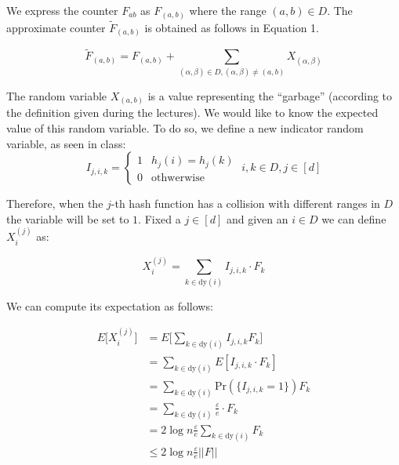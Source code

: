 \documentclass{article}
\begin{document}
\noindent We express the counter $F_{ab}$ as $F_{(a, b)}$ where the range $(a, b) \in D$. The approximate counter $\tilde{F}_{(a, b)}$ is obtained
as follows in Equation 1.

\begin{equation}
    \tilde{F}_{(a, b)} = F_{(a, b)} + \sum_{(\alpha, \beta) \in D,(\alpha, \beta) \ne (a, b)} X_{(\alpha, \beta)}
\end{equation}

\noindent The random variable $X_{(a, b)}$ is a value representing the ``garbage'' (according to the definition given during the lectures). We would like to know the expected value of this random variable.
To do so, we define a new indicator random variable, as seen in class:
\begin{equation*}
    I_{j,i,k} = \begin{cases}
        1 & h_j(i) = h_j(k) \\
        0 & \textrm{othwerwise}
    \end{cases} \; i, k \in D, j \in [d]
\end{equation*}

\noindent Therefore, when the $j$-th hash function has a collision with different ranges in $D$ the variable will be set to $1$. 
Fixed a $j \in [d]$ and given an $i \in D$ we can define $X_{i}^{(j)}$ as: 

\begin{equation*}
    X_{i}^{(j)} = \sum_{k \in \textrm{dy}(i)}I_{j, i, k} \cdot  F_k
\end{equation*}

\noindent We can compute its expectation as follows:

\begin{equation*}
    \begin{split}
        E\bigg[X_{i}^{(j)}\bigg] & = E\bigg[\sum_{k \in \textrm{dy}(i)}I_{j, i, k} F_k\bigg] \\
        & = \sum_{k \in \textrm{dy}(i)} E[I_{j, i, k} \cdot F_k] \\
        & = \sum_{k \in \textrm{dy}(i)} \textrm{Pr}(\{I_{j, i, k} = 1\}) F_k \\
        & = \sum_{k \in \textrm{dy}(i)} \frac{\varepsilon}{e} \cdot  F_k \\ 
        & = 2 \log n \frac{\varepsilon}{e} \sum_{k \in \textrm{dy}(i)} F_k \\
        & \le 2 \log n \frac{\varepsilon}{e} ||F||
    \end{split}
\end{equation*}
\end{document}
